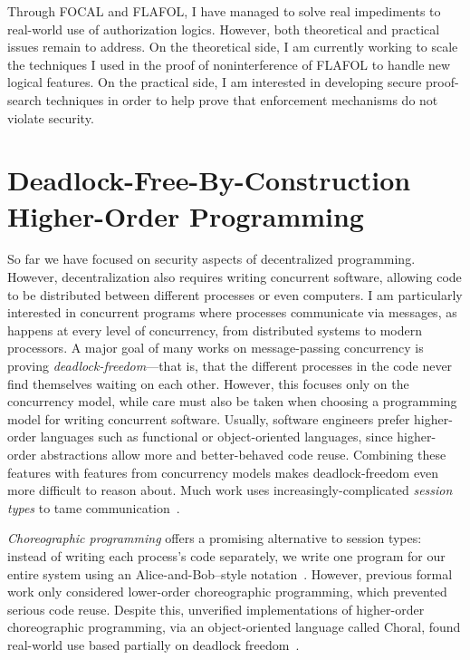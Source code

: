 \documentclass{article}
\theoremstyle{definition}
\begin{document}
Through FOCAL and FLAFOL, I have managed to solve real impediments to real-world use of authorization logics.
However, both theoretical and practical issues remain to address.
On the theoretical side, I am currently working to scale the techniques I used in the proof of noninterference of FLAFOL to handle new logical features.
On the practical side, I am interested in developing secure proof-search techniques in order to help prove that enforcement mechanisms do not violate security.

\section*{Deadlock-Free-By-Construction Higher-Order Programming}

So far we have focused on security aspects of decentralized programming.
However, decentralization also requires writing concurrent software, allowing code to be distributed between different processes or even computers.
I am particularly interested in concurrent programs where processes communicate via messages, as happens at every level of concurrency, from distributed systems to modern processors.
A major goal of many works on message-passing concurrency is proving \emph{deadlock-freedom}---that is, that the different processes in the code never find themselves waiting on each other.
However, this focuses only on the concurrency model, while care must also be taken when choosing a programming model for writing concurrent software.
Usually, software engineers prefer higher-order languages such as functional or object-oriented languages, since higher-order abstractions allow more and better-behaved code reuse.
Combining these features with features from concurrency models makes deadlock-freedom even more difficult to reason about.
Much work uses increasingly-complicated \emph{session types} to tame communication~\citep[see e.g.,][]{ScalasY19,HondaYC16}.

\emph{Choreographic programming} offers a promising alternative to session types: instead of writing each process's code separately, we write one program for our entire system using an Alice-and-Bob--style notation~\citep{Montesi13}.
However, previous formal work only considered lower-order choreographic programming, which prevented serious code reuse.
Despite this, unverified implementations of higher-order choreographic programming, via an object-oriented language called Choral, found real-world use based partially on deadlock freedom~\citep{GiallorenzoMP20}.
\end{document}
